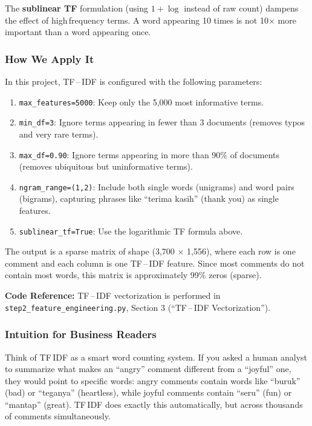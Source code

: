 \documentclass[12pt,a4paper,twoside]{article}
\theoremstyle{definition}
\begin{document}
The \textbf{sublinear TF} formulation (using $1 + \log$ instead of raw count) dampens the effect of high\,frequency terms. A word appearing 10 times is not 10$\times$ more important than a word appearing once.

\subsubsection{How We Apply It}

In this project, TF\,--\,IDF is configured with the following parameters:

\begin{enumerate}[leftmargin=2em]
    \item \texttt{max\_features=5000}: Keep only the 5{,}000 most informative terms.
    \item \texttt{min\_df=3}: Ignore terms appearing in fewer than 3 documents (removes typos and very rare terms).
    \item \texttt{max\_df=0.90}: Ignore terms appearing in more than 90\% of documents (removes ubiquitous but uninformative terms).
    \item \texttt{ngram\_range=(1,2)}: Include both single words (unigrams) and word pairs (bigrams), capturing phrases like ``terima kasih'' (thank you) as single features.
    \item \texttt{sublinear\_tf=True}: Use the logarithmic TF formula above.
\end{enumerate}

The output is a sparse matrix of shape (3{,}700 $\times$ 1{,}556), where each row is one comment and each column is one TF\,--\,IDF feature. Since most comments do not contain most words, this matrix is approximately 99\% zeros (sparse).

\begin{filebox}
\textbf{Code Reference:} TF\,--\,IDF vectorization is performed in \texttt{step2\_feature\_engineering.py}, Section 3 (``TF\,--\,IDF Vectorization'').
\end{filebox}


\subsubsection{Intuition for Business Readers}
 
Think of TF\,IDF as a smart word counting system. If you asked a human analyst to summarize what makes an ``angry'' comment different from a ``joyful'' one, they would point to specific words: angry comments contain words like ``buruk'' (bad) or ``teganya'' (heartless), while joyful comments contain ``seru'' (fun) or ``mantap'' (great). TF\,IDF does exactly this automatically, but across thousands of comments simultaneously.
 
\end{document}
